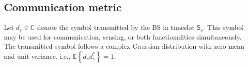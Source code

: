 \documentclass[10pt,journal,compsoc]{IEEEtran}
\theoremstyle{myremark}
\theoremstyle{myexample}
\newtheorem*{example}{Example}
\begin{document}






\subsection{Communication metric}


Let $ d_s \in \mathbb{C} $ denote the symbol transmitted by the \gls{BS} in timeslot $ \mathsf{S}_s $.  This symbol may be used for communication, sensing, or both functionalities simultaneously. The transmitted symbol follows a complex Gaussian distribution with zero mean and unit variance, i.e., $ \mathbb{E} \left\lbrace d_s d_s^{*} \right\rbrace = 1 $. 
\end{document}

